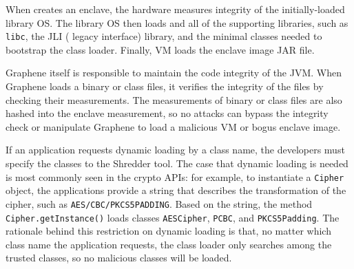 When \systemname{} creates an enclave, the \sgx{} hardware measures integrity of the initially-loaded library OS.
The library OS then loads \jvm{} and all of the supporting libraries,
such as {\tt libc},
the JLI (\java{} legacy interface) library, and the minimal \java{} classes needed to bootstrap the class loader.
Finally, \java{} VM loads the enclave image JAR file.

Graphene itself is responsible to maintain the code integrity of the JVM.
When Graphene loads a binary or class files,
it verifies the integrity of the files by checking their measurements.
The measurements of binary or class files are also
hashed into the enclave measurement,
so no attacks can bypass the integrity check or manipulate Graphene to load  a malicious \java{} VM or bogus enclave image.

If an application requests dynamic loading by a class name,
the developers must specify the classes to the Shredder tool.
The case that dynamic loading is needed is most commonly seen in the crypto APIs:
for example, to instantiate a {\tt Cipher} object,
the applications provide a string that describes the transformation
of the cipher, such as {\tt AES/CBC/PKCS5PADDING}.
Based on the string, the method {\tt Cipher.getInstance()} loads classes
{\tt AESCipher}, {\tt PCBC}, and {\tt PKCS5Padding}.
The rationale behind this restriction on dynamic loading is that, no matter
which class name the application requests,
the class loader only searches among the trusted classes,
so no malicious classes will be loaded.


